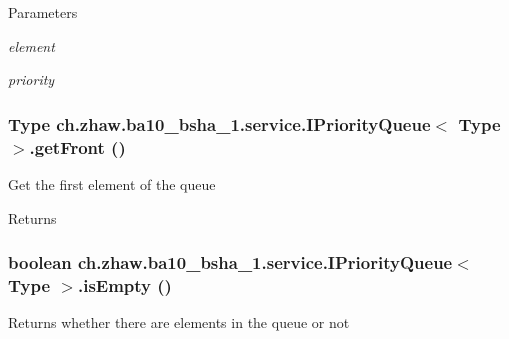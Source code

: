 \begin{DoxyParams}{Parameters}
\item[{\em element}]\item[{\em priority}]\end{DoxyParams}
\hypertarget{interfacech_1_1zhaw_1_1ba10__bsha__1_1_1service_1_1IPriorityQueue_3_01Type_01_4_aea8391905080302c5b40dd2241cd5f8e}{
\subsubsection[{getFront}]{\setlength{\rightskip}{0pt plus 5cm}Type ch.zhaw.ba10\_\-bsha\_\-1.service.IPriorityQueue$<$ Type $>$.getFront ()}}
\label{interfacech_1_1zhaw_1_1ba10__bsha__1_1_1service_1_1IPriorityQueue_3_01Type_01_4_aea8391905080302c5b40dd2241cd5f8e}
Get the first element of the queue

\begin{DoxyReturn}{Returns}

\end{DoxyReturn}
\hypertarget{interfacech_1_1zhaw_1_1ba10__bsha__1_1_1service_1_1IPriorityQueue_3_01Type_01_4_a648bb0e1ba43092a431d748a49d2c7ae}{
\subsubsection[{isEmpty}]{\setlength{\rightskip}{0pt plus 5cm}boolean ch.zhaw.ba10\_\-bsha\_\-1.service.IPriorityQueue$<$ Type $>$.isEmpty ()}}
\label{interfacech_1_1zhaw_1_1ba10__bsha__1_1_1service_1_1IPriorityQueue_3_01Type_01_4_a648bb0e1ba43092a431d748a49d2c7ae}
Returns whether there are elements in the queue or not

